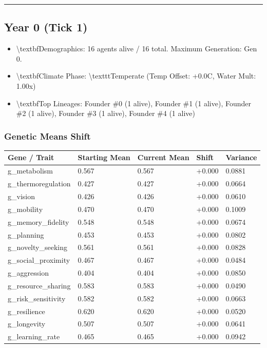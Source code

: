 \documentclass[11pt,a4paper]{article}
\begin{document}
\noindent\rule{\textwidth}{0.4pt}

\subsection*{ Year 0 (Tick 1)}
\begin{itemize}
  \item \textbackslash{}textbf{Demographics:} 16 agents alive / 16 total. Maximum Generation: Gen 0.
  \item \textbackslash{}textbf{Climate Phase:} \textbackslash{}texttt{Temperate} (Temp Offset: +0.0C, Water Mult: 1.00x)
  \item \textbackslash{}textbf{Top Lineages:} Founder \#0 (1 alive), Founder \#1 (1 alive), Founder \#2 (1 alive), Founder \#3 (1 alive), Founder \#4 (1 alive)
\end{itemize}

\subsubsection*{ Genetic Means Shift}
\begin{longtable}{lllll}
\toprule
Gene / Trait & Starting Mean & Current Mean & Shift & Variance \\
\midrule
\endhead
g\_metabolism & 0.567 & 0.567 & +0.000 & 0.0881 \\
g\_thermoregulation & 0.427 & 0.427 & +0.000 & 0.0664 \\
g\_vision & 0.426 & 0.426 & +0.000 & 0.0610 \\
g\_mobility & 0.470 & 0.470 & +0.000 & 0.1009 \\
g\_memory\_fidelity & 0.548 & 0.548 & +0.000 & 0.0674 \\
g\_planning & 0.453 & 0.453 & +0.000 & 0.0802 \\
g\_novelty\_seeking & 0.561 & 0.561 & +0.000 & 0.0828 \\
g\_social\_proximity & 0.467 & 0.467 & +0.000 & 0.0484 \\
g\_aggression & 0.404 & 0.404 & +0.000 & 0.0850 \\
g\_resource\_sharing & 0.583 & 0.583 & +0.000 & 0.0490 \\
g\_risk\_sensitivity & 0.582 & 0.582 & +0.000 & 0.0663 \\
g\_resilience & 0.620 & 0.620 & +0.000 & 0.0520 \\
g\_longevity & 0.507 & 0.507 & +0.000 & 0.0641 \\
g\_learning\_rate & 0.465 & 0.465 & +0.000 & 0.0942 \\
\bottomrule
\end{longtable}
\end{document}
